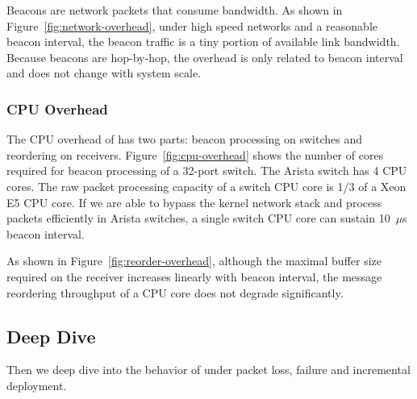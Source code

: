 
Beacons are network packets that consume bandwidth.
As shown in Figure~\ref{fig:network-overhead}, under high speed networks and a reasonable beacon interval, the beacon traffic is a tiny portion of available link bandwidth.
Because beacons are hop-by-hop, the overhead is only related to beacon interval and does not change with system scale.

\subsubsection{CPU Overhead}
\label{sec:eval-cpu-overhead}

The CPU overhead of \sys has two parts: beacon processing on switches and reordering on receivers.
Figure~\ref{fig:cpu-overhead} shows the number of cores required for beacon processing of a 32-port switch.
The Arista switch has 4 CPU cores.
The raw packet processing capacity of a switch CPU core is 1/3 of a Xeon E5 CPU core.
If we are able to bypass the kernel network stack and process packets efficiently in Arista switches, a single switch CPU core can sustain 10~$\mu$s beacon interval.

As shown in Figure~\ref{fig:reorder-overhead}, although the maximal buffer size required on the receiver increases linearly with beacon interval, the message reordering throughput of a CPU core does not degrade significantly.

\subsection{Deep Dive}


Then we deep dive into the behavior of \sys under packet loss, failure and incremental deployment.

